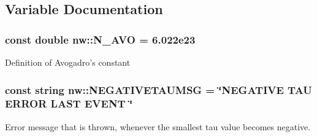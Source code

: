 \subsection{Variable Documentation}
\hypertarget{namespacenw_ad890cfa7dd9eaf8d5b6754723e516c4a}{
\subsubsection[{N\+\_\+\+A\+V\+O}]{\setlength{\rightskip}{0pt plus 5cm}const double nw\+::\+N\+\_\+\+A\+V\+O = 6.\+022e23\hspace{0.3cm}{\ttfamily [static]}}}\label{namespacenw_ad890cfa7dd9eaf8d5b6754723e516c4a}
Definition of Avogadro's constant \hypertarget{namespacenw_a7d9622d3fd42f8d91bb8b8a79688518d}{
\subsubsection[{N\+E\+G\+A\+T\+I\+V\+E\+T\+A\+U\+M\+S\+G}]{\setlength{\rightskip}{0pt plus 5cm}const string nw\+::\+N\+E\+G\+A\+T\+I\+V\+E\+T\+A\+U\+M\+S\+G = \char`\"{}N\+E\+G\+A\+T\+I\+V\+E T\+A\+U E\+R\+R\+O\+R L\+A\+S\+T E\+V\+E\+N\+T \char`\"{}\hspace{0.3cm}{\ttfamily [static]}}}\label{namespacenw_a7d9622d3fd42f8d91bb8b8a79688518d}


Error message that is thrown, whenever the smallest tau value becomes negative. 

